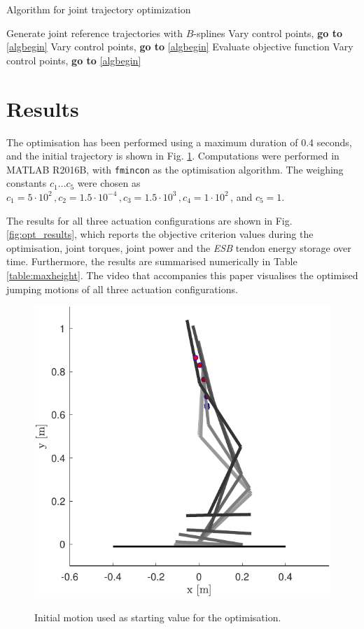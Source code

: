 \documentclass[letterpaper, 10 pt, conference]{ieeeconf}  %
\begin{document}
\begin{algorithm}[H]
	\caption{Algorithm for joint trajectory optimization} \label{algo}
	\begin{algorithmic}[1]
		 \STATE  Generate joint reference trajectories with $B$-splines \label{algbegin}
		  \ELSE \STATE Vary control points, \textbf{go to} \ref{algbegin}  \ENDIF
		   \ENDWHILE
		  \ELSE \STATE Vary control points, \textbf{go to} \ref{algbegin}  \ENDIF
		\STATE Evaluate objective function
		  \ELSE \STATE Vary control points, \textbf{go to} \ref{algbegin}  \ENDIF
	\end{algorithmic}
\end{algorithm}


\section{Results} \label{sec:results}
The optimisation has been performed using a maximum duration of 0.4 seconds, and the initial trajectory is shown in Fig. \ref{fig:seq}. Computations were performed in MATLAB R2016B, with \texttt{fmincon} as the optimisation algorithm. The weighing constants $c_1 \dots c_5$ were chosen as $c_1=5 \cdot 10^{2} \,, c_2=1.5 \cdot 10^{-4} \,, c_3=1.5 \cdot 10^{3} \,, c_4 = 1\cdot 10^{2}\,$, and $c_5 = 1$.

The results for all three actuation configurations are shown in Fig. \ref{fig:opt_results}, which reports the objective criterion values during the optimisation, joint torques, joint power and the \textit{ESB} tendon energy storage over time. Furthermore, the results are summarised numerically in Table \ref{table:maxheight}. The video that accompanies this paper visualises the optimised jumping motions of all three actuation configurations.

\begin{figure}[b]
	\centering
	{\includegraphics[width=0.6\linewidth]{initialguess}
	}%
	\caption{Initial motion used as starting value for the optimisation.}
	\label{fig:seq}	
\end{figure}
\end{document}
